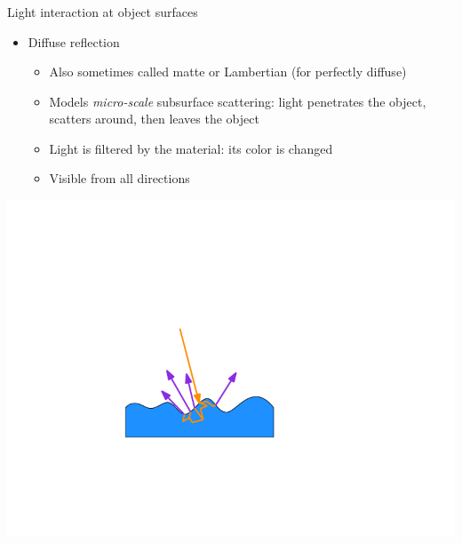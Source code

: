\documentclass[utf8,stillsansserifmath,fleqn,t]{beamer}
\begin{document}
\begin{frame}
\frametitle{\insertsection}
Light interaction at object surfaces
\begin{itemize}
\item Diffuse reflection
    \begin{itemize}
    \item Also sometimes called matte or Lambertian (for perfectly diffuse)
    \item Models \emph{micro-scale} subsurface scattering: light penetrates the object,
    scatters around, then leaves the object
    \item Light is filtered by the material: its color is changed
    \item Visible from all directions
    \end{itemize}
\end{itemize}
\centerline{\includegraphics[width=.5\textwidth]{./fig/reflection-diffuse-physical.pdf}}
\end{frame}
\end{document}

